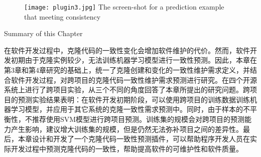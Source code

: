 \begin{figure}[htbp]
\centering
\texttt{[image: plugin3.jpg]}
{The screen-shot for a prediction example that meeting consistency}
\vspace{-1em}
\end{figure}



{Summary of this Chapter}

在软件开发过程中，克隆代码的一致性变化会增加软件维护的代价。然而，软件开发初期由于克隆实例较少，无法训练机器学习模型进行一致性预测。因此，本章在第3章和第4章研究的基础上，统一了克隆创建和变化的一致性维护需求定义，并结合软件开发过程，对跨项目的克隆代码一致性维护需求预测进行研究。在四个开源系统上进行了跨项目实验，从三个不同的角度回答了本章所提出的研究问题。跨项目的预测实验结果表明：在软件开发初期阶段，可以使用跨项目的训练数据训练机器学习模型，并应用于其它系统的克隆一致性需求预测中。同时，由于样本的不平衡性，不推荐使用SVM模型进行跨项目预测。训练集的规模会对跨项目的预测能力产生影响，建议增大训练集的规模，但是仍然无法弥补项目之间的差异性。最后，本章设计和开发了一个克隆代码一致性预测插件，可以帮助程序开发人员在实际开发过程中预测克隆代码的一致性，帮助提高软件的可维护性和软件质量。